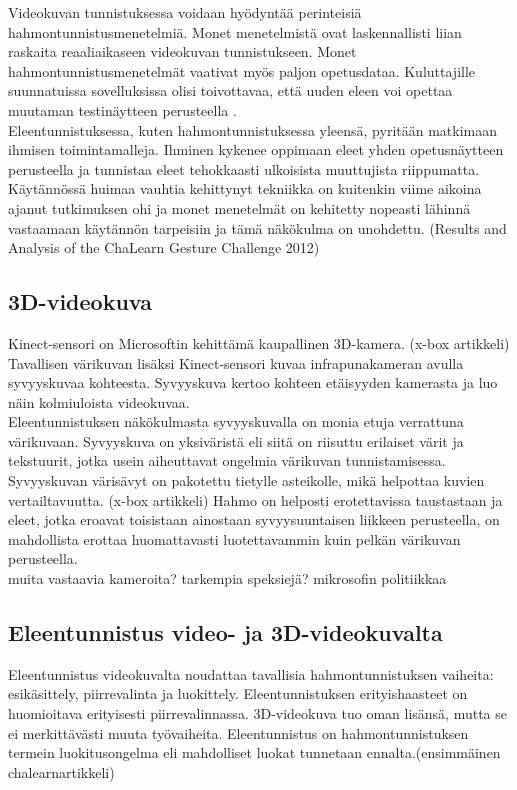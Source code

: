 Videokuvan tunnistuksessa voidaan hyödyntää perinteisiä hahmontunnistusmenetelmiä. Monet menetelmistä ovat laskennallisti liian raskaita 
reaaliaikaseen videokuvan tunnistukseen. \citep {1251144} Monet hahmontunnistusmenetelmät vaativat myös paljon opetusdataa. Kuluttajille suunnatuissa
sovelluksissa olisi toivottavaa, että uuden eleen voi opettaa muutaman testinäytteen perusteella \citep {1251144}.\\

Eleentunnistuksessa, kuten hahmontunnistuksessa yleensä, pyritään matkimaan ihmisen toimintamalleja. Ihminen
kykenee oppimaan eleet yhden opetusnäytteen perusteella ja tunnistaa eleet tehokkaasti ulkoisista muuttujista riippumatta. 
Käytännössä huimaa vauhtia kehittynyt tekniikka on kuitenkin
viime aikoina ajanut tutkimuksen ohi ja monet menetelmät on kehitetty nopeasti lähinnä vastaamaan käytännön tarpeisiin ja tämä näkökulma on unohdettu. (Results and Analysis of the ChaLearn Gesture Challenge 2012)

\subsection{3D-videokuva}
Kinect-sensori on Microsoftin kehittämä kaupallinen 3D-kamera. (x-box artikkeli)
Tavallisen värikuvan lisäksi Kinect-sensori kuvaa infrapunakameran avulla syvyyskuvaa kohteesta.
Syvyyskuva kertoo kohteen etäisyyden kamerasta ja luo näin kolmiuloista videokuvaa. \\

Eleentunnistuksen näkökulmasta syvyyskuvalla on monia etuja verrattuna värikuvaan. Syvyyskuva on yksiväristä eli siitä on riisuttu erilaiset värit ja tekstuurit, jotka
usein aiheuttavat ongelmia värikuvan tunnistamisessa. Syvyyskuvan värisävyt on pakotettu tietylle 
asteikolle, mikä helpottaa kuvien vertailtavuutta. (x-box artikkeli) Hahmo on helposti erotettavissa
taustastaan ja eleet, jotka eroavat toisistaan ainostaan syvyysuuntaisen liikkeen perusteella, 
on mahdollista erottaa huomattavasti luotettavammin kuin pelkän värikuvan perusteella.\\

muita vastaavia kameroita? tarkempia speksiejä? mikrosofin politiikkaa

\subsection{Eleentunnistus video- ja 3D-videokuvalta}

Eleentunnistus videokuvalta noudattaa tavallisia hahmontunnistuksen vaiheita: esikäsittely, piirrevalinta ja
luokittely. Eleentunnistuksen erityishaasteet on huomioitava erityisesti piirrevalinnassa. 3D-videokuva tuo 
oman lisänsä, mutta se ei merkittävästi muuta työvaiheita. Eleentunnistus on hahmontunnistuksen termein
luokitusongelma eli mahdolliset luokat tunnetaan ennalta.(ensimmäinen chalearnartikkeli)  \\

